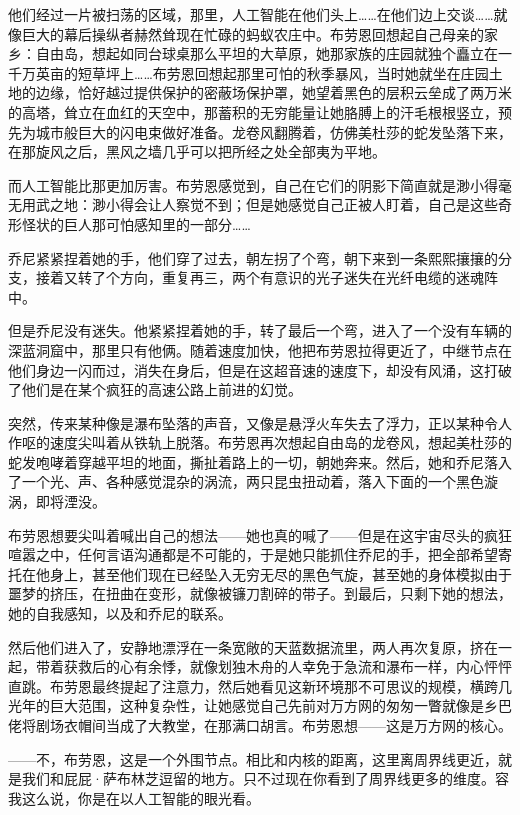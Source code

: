 \documentclass[AutoFakeBold=true]{book}
\begin{document}
他们经过一片被扫荡的区域，那里，人工智能在他们头上……在他们边上交谈……就像巨大的幕后操纵者赫然耸现在忙碌的蚂蚁农庄中。布劳恩回想起自己母亲的家乡：自由岛，想起如同台球桌那么平坦的大草原，她那家族的庄园就独个矗立在一千万英亩的短草坪上……布劳恩回想起那里可怕的秋季暴风，当时她就坐在庄园土地的边缘，恰好越过提供保护的密蔽场保护罩，她望着黑色的层积云垒成了两万米的高塔，耸立在血红的天空中，那蓄积的无穷能量让她胳膊上的汗毛根根竖立，预先为城市般巨大的闪电束做好准备。龙卷风翻腾着，仿佛美杜莎的蛇发坠落下来，在那旋风之后，黑风之墙几乎可以把所经之处全部夷为平地。

而人工智能比那更加厉害。布劳恩感觉到，自己在它们的阴影下简直就是渺小得毫无用武之地：渺小得会让人察觉不到；但是她感觉自己正被人盯着，自己是这些奇形怪状的巨人那可怕感知里的一部分……

乔尼紧紧捏着她的手，他们穿了过去，朝左拐了个弯，朝下来到一条熙熙攘攘的分支，接着又转了个方向，重复再三，两个有意识的光子迷失在光纤电缆的迷魂阵中。

但是乔尼没有迷失。他紧紧捏着她的手，转了最后一个弯，进入了一个没有车辆的深蓝洞窟中，那里只有他俩。随着速度加快，他把布劳恩拉得更近了，中继节点在他们身边一闪而过，消失在身后，但是在这超音速的速度下，却没有风涌，这打破了他们是在某个疯狂的高速公路上前进的幻觉。

突然，传来某种像是瀑布坠落的声音，又像是悬浮火车失去了浮力，正以某种令人作呕的速度尖叫着从铁轨上脱落。布劳恩再次想起自由岛的龙卷风，想起美杜莎的蛇发咆哮着穿越平坦的地面，撕扯着路上的一切，朝她奔来。然后，她和乔尼落入了一个光、声、各种感觉混杂的涡流，两只昆虫扭动着，落入下面的一个黑色漩涡，即将湮没。

布劳恩想要尖叫着喊出自己的想法——她也真的喊了——但是在这宇宙尽头的疯狂喧嚣之中，任何言语沟通都是不可能的，于是她只能抓住乔尼的手，把全部希望寄托在他身上，甚至他们现在已经坠入无穷无尽的黑色气旋，甚至她的身体模拟由于噩梦的挤压，在扭曲在变形，就像被镰刀割碎的带子。到最后，只剩下她的想法，她的自我感知，以及和乔尼的联系。

然后他们进入了，安静地漂浮在一条宽敞的天蓝数据流里，两人再次复原，挤在一起，带着获救后的心有余悸，就像划独木舟的人幸免于急流和瀑布一样，内心怦怦直跳。布劳恩最终提起了注意力，然后她看见这新环境那不可思议的规模，横跨几光年的巨大范围，这种复杂性，让她感觉自己先前对万方网的匆匆一瞥就像是乡巴佬将剧场衣帽间当成了大教堂，在那满口胡言。布劳恩想——这是万方网的核心。

{\kaishu ——不，布劳恩，这是一个外围节点。相比和内核的距离，这里离周界线更近，就是我们和屁屁·萨布林芝逗留的地方。只不过现在你看到了周界线更多的维度。容我这么说，你是在以人工智能的眼光看。}
\end{document}

